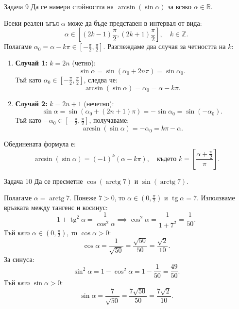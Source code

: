 \begin{problembox}{Задача 9}
Да се намери стойността на $\arcsin(\sin\alpha)$ за всяко $\alpha \in \mathbb{R}$.
\end{problembox}

\begin{solution}
Всеки реален ъгъл $\alpha$ може да бъде представен в интервал от вида:
\[
\alpha \in \left[(2k-1)\frac{\pi}{2}, (2k+1)\frac{\pi}{2}\right], \quad k \in \mathbb{Z}.
\]
Полагаме $\alpha_0 = \alpha - k\pi \in \left[-\frac{\pi}{2}, \frac{\pi}{2}\right]$.
Разглеждаме два случая за четността на $k$:
\begin{enumerate}
    \item \textbf{Случай 1:} $k = 2n$ (четно):
    \[
    \sin\alpha = \sin(\alpha_0 + 2n\pi) = \sin\alpha_0.
    \]
    Тъй като $\alpha_0 \in \left[-\frac{\pi}{2}, \frac{\pi}{2}\right]$, следва че:
    \[
    \arcsin(\sin\alpha) = \alpha_0 = \alpha - k\pi.
    \]
    \item \textbf{Случай 2:} $k = 2n+1$ (нечетно):
    \[
    \sin\alpha = \sin(\alpha_0 + (2n+1)\pi) = -\sin\alpha_0 = \sin(-\alpha_0).
    \]
    Тъй като $-\alpha_0 \in \left[-\frac{\pi}{2}, \frac{\pi}{2}\right]$, получаваме:
    \[
    \arcsin(\sin\alpha) = -\alpha_0 = k\pi - \alpha.
    \]
\end{enumerate}
Обединената формула е:
\[
\arcsin(\sin\alpha) = (-1)^k(\alpha - k\pi), \quad \text{където } k = \left[\frac{\alpha + \frac{\pi}{2}}{\pi}\right].
\]
\end{solution}

\begin{problembox}{Задача 10}
Да се пресметне $\cos(\operatorname{arctg} 7)$ и $\sin(\operatorname{arctg} 7)$.
\end{problembox}

\begin{solution}
Полагаме $\alpha = \operatorname{arctg} 7$. Понеже $7 > 0$, то $\alpha \in \left(0, \frac{\pi}{2}\right)$ и $\operatorname{tg}\alpha = 7$.
Използваме връзката между тангенс и косинус:
\[
1 + \operatorname{tg}^2\alpha = \frac{1}{\cos^2\alpha} \implies \cos^2\alpha = \frac{1}{1+7^2} = \frac{1}{50}.
\]
Тъй като $\alpha \in \left(0, \frac{\pi}{2}\right)$, то $\cos\alpha > 0$:
\[
\cos\alpha = \frac{1}{\sqrt{50}} = \frac{\sqrt{50}}{50} = \frac{\sqrt{2}}{10}.
\]
За синуса:
\[
\sin^2\alpha = 1 - \cos^2\alpha = 1 - \frac{1}{50} = \frac{49}{50}.
\]
Тъй като $\sin\alpha > 0$:
\[
\sin\alpha = \frac{7}{\sqrt{50}} = \frac{7\sqrt{50}}{50} = \frac{7\sqrt{2}}{10}.
\]
\end{solution}